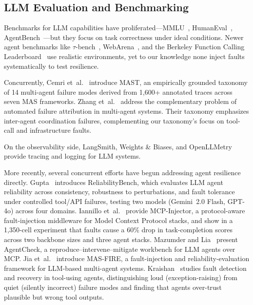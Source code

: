 \documentclass[make,article,submit,moreauthors,pdftex]{mdpi}
\begin{document}
\subsection{LLM Evaluation and Benchmarking}

Benchmarks for LLM capabilities have proliferated---MMLU~\cite{hendrycks2021measuring}, HumanEval~\cite{chen2021evaluating}, AgentBench~\cite{liu2023agentbench}---but they focus on task correctness under ideal conditions. Newer agent benchmarks like $\tau$-bench~\cite{yao2024tau}, WebArena~\cite{zhou2024webarena}, and the Berkeley Function Calling Leaderboard~\cite{patil2025bfcl} use realistic environments, yet to our knowledge none inject faults systematically to test resilience.

{\color{magenta}Concurrently, Cemri et~al.~\cite{cemri2025mast} introduce MAST, an empirically grounded taxonomy of 14 multi-agent failure modes derived from 1{,}600+ annotated traces across seven MAS frameworks. Zhang et~al.~\cite{zhang2025failure} address the complementary problem of automated failure attribution in multi-agent systems. Their taxonomy emphasizes inter-agent coordination failures, complementing our taxonomy's focus on tool-call and infrastructure faults.}

On the observability side, LangSmith, Weights \& Biases, and OpenLLMetry~\cite{openllmetry2024} provide tracing and logging for LLM systems.

{\color{magenta}More recently, several concurrent efforts have begun addressing agent resilience directly. Gupta~\cite{reliabilitybench2026} introduces ReliabilityBench, which evaluates LLM agent reliability across consistency, robustness to perturbations, and fault tolerance under controlled tool/API failures, testing two models (Gemini~2.0 Flash, GPT-4o) across four domains. Iannillo et~al.~\cite{mcpinjector2026} provide MCP-Injector, a protocol-aware fault-injection middleware for Model Context Protocol stacks, and show in a 1{,}350-cell experiment that faults cause a 60\% drop in task-completion scores across two backbone sizes and three agent stacks. Mazumder and Lia~\cite{mazumder2026agentcheck} present AgentCheck, a reproduce--intervene--mitigate workbench for LLM agents over MCP. Jia et~al.~\cite{jia2026masfire} introduce MAS-FIRE, a fault-injection and reliability-evaluation framework for LLM-based multi-agent systems. Kraishan~\cite{kraishan2026loud} studies fault detection and recovery in tool-using agents, distinguishing loud (exception-raising) from quiet (silently incorrect) failure modes and finding that agents over-trust plausible but wrong tool outputs.}
\end{document}
